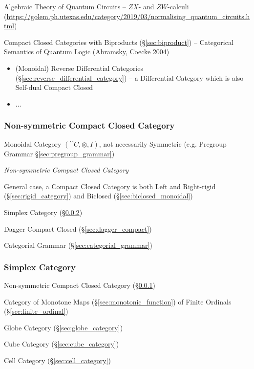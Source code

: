 Algebraic Theory of Quantum Circuits -- $ZX$- and $ZW$-calculi
(\url{https://golem.ph.utexas.edu/category/2019/03/normalising_quantum_circuits.html})

Compact Closed Categories with Biproducts (\S\ref{sec:biproduct}) -- Categorical
Semantics of Quantum Logic (Abramsky, Coecke 2004)

\begin{itemize}
  \item (Monoidal) Reverse Differential Categories
    (\S\ref{sec:reverse_differential_category}) -- a Differential Category which
    is also Self-dual Compact Closed
  \item ...
\end{itemize}



\subsubsection{Non-symmetric Compact Closed Category}
\label{sec:nonsymmetric_compact_closed}

Monoidal Category $(\cat{C}, \otimes, I)$, not necessarily Symmetric
(e.g. Pregroup Grammar \S\ref{sec:pregroup_grammar})

\emph{Non-symmetric Compact Closed Category}

General case, a Compact Closed Category is both Left and Right-rigid
(\S\ref{sec:rigid_category}) and Biclosed
(\S\ref{sec:biclosed_monoidal})

Simplex Category (\S\ref{sec:simplex_category})

Dagger Compact Closed (\S\ref{sec:dagger_compact})

Categorial Grammar (\S\ref{sec:categorial_grammar})



\subsubsection{Simplex Category}\label{sec:simplex_category}

Non-symmetric Compact Closed Category (\S\ref{sec:nonsymmetric_compact_closed})

Category of Monotone Maps (\S\ref{sec:monotonic_function}) of Finite Ordinals
(\S\ref{sec:finite_ordinal})

\fist Globe Category (\S\ref{sec:globe_category})

\fist Cube Category (\S\ref{sec:cube_category})

\fist Cell Category (\S\ref{sec:cell_category})



